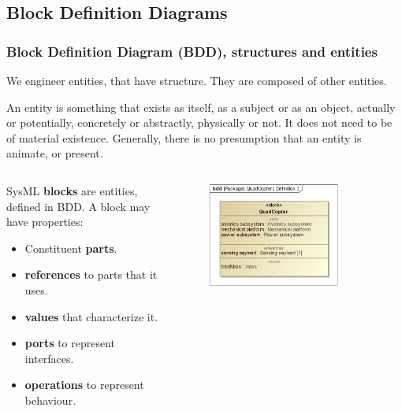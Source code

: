 \documentclass[xcolor=dvipsnames,t]{beamer}
\begin{document}
\subsection{Block Definition Diagrams}

\begin{frame}
\frametitle {Block Definition Diagram (BDD), structures and entities}
We engineer entities, that have structure. They are composed of other entities. 
\begin{block}{}
An entity is something that exists as itself, as a subject or as an object, actually or potentially, concretely or abstractly, physically or not. It does not need to be of material existence. Generally, there is no presumption that an entity is animate, or present.
\end{block}

\begin{columns}

	\begin{column}{0.5\textwidth}
SysML \textbf{blocks} are entities, defined in BDD.
A block may have properties:
\begin{itemize}
\item Constituent \textbf{parts}.
\item \textbf{references} to parts that it uses.
\item \textbf{values} that characterize it.
\item \textbf{ports} to represent interfaces.
\item \textbf{operations} to represent behaviour.
\end{itemize}
	\end{column}

	\begin{column}{0.5\textwidth}
\vspace{-0.5cm}
\begin{figure}
 	\includegraphics[width=0.8\textwidth]{BDD1.PNG}
\end{figure}
	\end{column}


\end{columns}
\end{frame}
\end{document}
